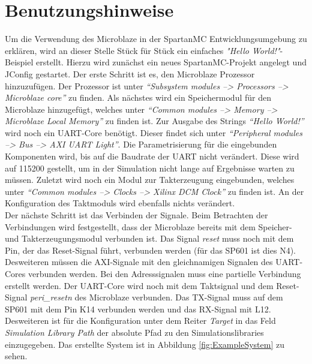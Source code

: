 \chapter{Benutzungshinweise}
Um die Verwendung des Microblaze in der SpartanMC Entwicklungsumgebung zu erklären, wird an dieser Stelle Stück für Stück ein einfaches \textit{"Hello World!"}-Beispiel erstellt.
Hierzu wird zunächst ein neues SpartanMC-Projekt angelegt und JConfig gestartet. Der erste Schritt ist es, den Microblaze Prozessor hinzuzufügen. Der Prozessor ist unter \textit{``Subsystem modules --> Processors --> Microblaze core''} zu finden. Als nächstes wird ein Speichermodul für den Microblaze hinzugefügt, welches unter \textit{``Common modules --> Memory --> Microblaze Local Memory''} zu finden ist. Zur Ausgabe des Strings \textit{``Hello World!''} wird noch ein UART-Core benötigt. Dieser findet sich unter \textit{``Peripheral modules --> Bus --> AXI UART Light''}. Die Parametrisierung für die eingebunden Komponenten wird, bis auf die Baudrate der UART nicht verändert. Diese wird auf 115200 gestellt, um in der Simulation nicht lange auf Ergebnisse warten zu müssen. Zuletzt wird noch ein Modul zur Takterzeugung eingebunden, welches unter \textit{``Common modules --> Clocks --> Xilinx DCM Clock''} zu finden ist. An der Konfiguration des Taktmoduls wird ebenfalls nichts verändert.\\
Der nächste Schritt ist das Verbinden der Signale. Beim Betrachten der Verbindungen wird festgestellt, dass der Microblaze bereits mit dem Speicher- und Takterzeugungsmodul verbunden ist. Das Signal \textit{reset} muss noch mit dem Pin, der das Reset-Signal führt, verbunden werden (für das SP601 ist dies N4). Desweiteren müssen die AXI-Signale mit den gleichnamigen Signalen des UART-Cores verbunden werden. Bei den Adresssignalen muss eine partielle Verbindung erstellt werden. Der UART-Core wird noch mit dem Taktsignal und dem Reset-Signal \textit{peri\_resetn} des Microblaze verbunden. Das TX-Signal muss auf dem SP601 mit dem Pin K14 verbunden werden und das RX-Signal mit L12.\\
Desweiteren ist für die Konfiguration unter dem Reiter \textit{Target} in das Feld \textit{Simulation Library Path} der absolute Pfad zu den Simulationslibraries einzugegeben. Das erstellte System ist in Abbildung \ref{fig:ExampleSystem} zu sehen.

